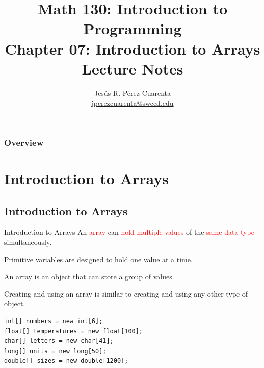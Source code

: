 \documentclass[11pt]{beamer}
\title[Chapter 07 Notes]{Math 130: Introduction to Programming \\ Chapter 07: Introduction to Arrays \\ Lecture Notes}
\author{Jesús R. Pérez Cuarenta \\
\href{mailto:jperezcuarenta@swccd.edu}{jperezcuarenta@swccd.edu}
}
\date{} %
\newcommand{\red}[1]{\textcolor{red}{#1}}
\begin{document}
% 
% 

\begin{frame}
  \maketitle
\end{frame}

\begin{frame}
\frametitle{Overview}
    \begin{multicols}{2}
    \tableofcontents
    \end{multicols}
\end{frame}

\section{Introduction to Arrays}
\subsection{Introduction to Arrays}
\begin{frame}[fragile]{Introduction to Arrays}
    An \red{array} can \red{hold multiple values} of the \red{same data type} simultaneously. \\ \vspace{1em}

    Primitive variables are designed to hold one value at a time. \\ \vspace{1em}

    An array is an object that can store a group of values. \\ \vspace{1em}

    Creating and using an array is similar to creating and using any other type of object.

    \begin{lstlisting}
int[] numbers = new int[6];
float[] temperatures = new float[100];
char[] letters = new char[41];
long[] units = new long[50];
double[] sizes = new double[1200];
    \end{lstlisting}
\end{frame}
\end{document}
